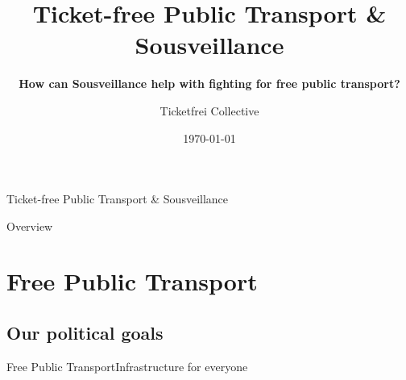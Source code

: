 \documentclass[10pt]{beamer}
\title[] %
{ %
      \textbf{Ticket-free Public Transport \& Sousveillance}
}
\subtitle[Ticket-free Public Transport \& Sousveillance]
{
      \textbf{How can Sousveillance help with fighting for free public transport?}
}
\author[Ticketfrei]
{      Ticketfrei Collective \\
      {}
}
\institute[]
{
      ticketfrei kollektiv
  
}
\date{\today}
\begin{document}

{\1%



\begin{frame}{Ticket-free Public Transport \& Sousveillance}

\maketitle
\tableofcontents

\end{frame}

\begin{frame}{Overview}{}

\tableofcontents

\end{frame}

\section{Free Public Transport}
\subsection{Our political goals}
\begin{frame}{Free Public Transport}{Infrastructure for everyone}


\end{frame}}
\end{document}
